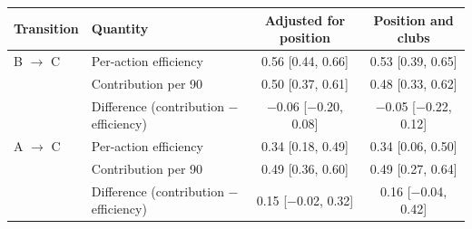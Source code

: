 \begin{tabular}{llcc}
\toprule
Transition & Quantity & Adjusted for position & Position and clubs \\
\midrule
B $\to$ C & Per-action efficiency & 0.56 [0.44, 0.66] & 0.53 [0.39, 0.65] \\
 & Contribution per 90 & 0.50 [0.37, 0.61] & 0.48 [0.33, 0.62] \\
 & Difference (contribution $-$ efficiency) & $-$0.06 [$-$0.20, 0.08] & $-$0.05 [$-$0.22, 0.12] \\
\addlinespace
A $\to$ C & Per-action efficiency & 0.34 [0.18, 0.49] & 0.34 [0.06, 0.50] \\
 & Contribution per 90 & 0.49 [0.36, 0.60] & 0.49 [0.27, 0.64] \\
 & Difference (contribution $-$ efficiency) & 0.15 [$-$0.02, 0.32] & 0.16 [$-$0.04, 0.42] \\
\bottomrule
\end{tabular}
